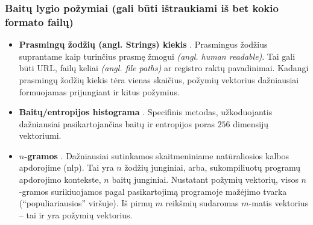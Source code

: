 \subsubsection{Baitų lygio požymiai (gali būti ištraukiami iš bet kokio formato failų)}
\begin{itemize}
    \item \textbf{Prasmingų žodžių (angl. Strings) kiekis} \cite{andersonLearningEvadeStatic2018}. Prasmingus žodžius suprantame kaip turinčius prasmę žmogui \textit{(angl. human readable)}. Tai gali būti URL, failų keliai \textit{(angl. file paths)} ar registro raktų pavadinimai. Kadangi prasmingų žodžių kiekis tėra vienas skaičius, požymių vektorius dažniausiai formuojamas prijungiant ir kitus požymius.
    \item \textbf{Baitų/entropijos histograma} \cite{saxeDeepNeuralNetwork2015}. Specifinis metodas, užkoduojantis dažniausiai pasikartojančias baitų ir entropijos poras $256$ dimensijų vektoriumi.
    \item \textbf{$n$-gramos} \cite{zhuNgramMalGANEvading2022}. Dažniausiai sutinkamos skaitmeniniame natūraliosios kalbos apdorojime (\acs{nlp}). Tai yra $n$ žodžių junginiai, arba, sukompiliuotų programų apdorojimo kontekste, $n$ baitų junginiai. Nustatant požymių vektorių, visos $n$-gramos surikiuojamos pagal pasikartojimą programoje mažėjimo tvarka (\enquote{populiariausios} viršuje). Iš pirmų $m$ reikšmių sudaromas $m$-matis vektorius -- tai ir yra požymių vektorius.
\end{itemize}